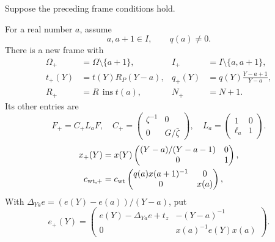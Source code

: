 \begin{theorem}\label{re-recursive-frame}
Suppose the preceding frame conditions hold.

For a real number \(a\), assume
\begin{equation}
                a,a+1\in I,\qquad q(a)\ne0.     \label{re-plus-hyp}
\end{equation}
There is a new frame with
\begin{equation}
 \begin{aligned}
 \Omega_+&=\Omega\setminus\{a+1\},&
 I_+&=I\setminus\{a,a+1\},\\
 t_+(Y)&=t(Y)R_P(Y-a),&
 q_+(Y)&=q(Y)\frac{Y-a+1}{Y-a},\\
 R_+&=R\,\operatorname{ins}t(a),&
 N_+&=N+1.
 \end{aligned}                                                   \label{re-plus-module}
\end{equation}
Its other entries are
\begin{equation}
 F_+=C_+L_aF,\quad
 C_+=\begin{pmatrix}\zeta^{-1}&0\\0&G/\bar\zeta\end{pmatrix},\quad
 L_a=\begin{pmatrix}1&0\\\ell_a&1\end{pmatrix}.                 \label{re-plus-F}
\end{equation}
\begin{align}
 x_+(Y)&=x(Y)
       \begin{pmatrix}(Y-a)/(Y-a-1)&0\\0&1\end{pmatrix},\nonumber\\
 c_{{\rm wt},+}&=c_{\rm wt}
       \begin{pmatrix}q(a)x(a+1)^{-1}&0\\0&x(a)\end{pmatrix},
                                                               \label{re-plus-xc}
\end{align}
With \(\Delta_{Ya}e=(e(Y)-e(a))/(Y-a)\), put
\begin{equation}
 e_+(Y)=
 \begin{pmatrix}
 e(Y)-\Delta_{Ya}e+t_z&-(Y-a)^{-1}\\
 0&x(a)^{-1}e(Y)x(a)
 \end{pmatrix}.                                \label{re-plus-e}
\end{equation}


\end{theorem}
